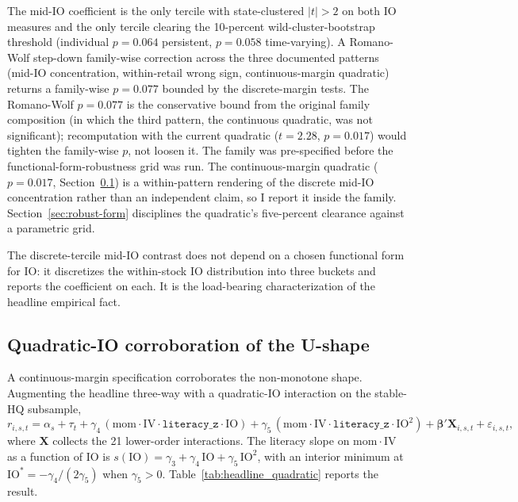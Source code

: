 The mid-IO coefficient is the only tercile with state-clustered $|t|>2$ on both IO measures and the only tercile clearing the 10-percent wild-cluster-bootstrap threshold (individual $p = 0.064$ persistent, $p = 0.058$ time-varying). A Romano-Wolf step-down family-wise correction across the three documented patterns (mid-IO concentration, within-retail wrong sign, continuous-margin quadratic) returns a family-wise $p = 0.077$ bounded by the discrete-margin tests. The Romano-Wolf $p = 0.077$ is the conservative bound from the original family composition (in which the third pattern, the continuous quadratic, was not significant); recomputation with the current quadratic ($t = 2.28$, $p = 0.017$) would tighten the family-wise $p$, not loosen it. The family was pre-specified before the functional-form-robustness grid was run. The continuous-margin quadratic ($p = 0.017$, Section~\ref{sec:quadratic}) is a within-pattern rendering of the discrete mid-IO concentration rather than an independent claim, so I report it inside the family. Section~\ref{sec:robust-form} disciplines the quadratic's five-percent clearance against a parametric grid.

The discrete-tercile mid-IO contrast does not depend on a chosen functional form for IO: it discretizes the within-stock IO distribution into three buckets and reports the coefficient on each. It is the load-bearing characterization of the headline empirical fact.

\subsection{Quadratic-IO corroboration of the U-shape}
\label{sec:quadratic}

A continuous-margin specification corroborates the non-monotone shape. Augmenting the headline three-way with a quadratic-IO interaction on the stable-HQ subsample,
\begin{equation}
\label{eq:quadIO}
r_{i,s,t} = \alpha_{s} + \tau_{t}
+ \gamma_{4}\,(\mathrm{mom}\cdot\mathrm{IV}\cdot\mathtt{literacy\_z}\cdot\mathrm{IO})
+ \gamma_{5}\,(\mathrm{mom}\cdot\mathrm{IV}\cdot\mathtt{literacy\_z}\cdot\mathrm{IO}^{2})
+ \boldsymbol{\beta}'\mathbf{X}_{i,s,t} + \varepsilon_{i,s,t},
\end{equation}
where $\mathbf{X}$ collects the 21 lower-order interactions. The literacy slope on $\mathrm{mom}\cdot\mathrm{IV}$ as a function of IO is $s(\mathrm{IO}) = \gamma_{3} + \gamma_{4}\,\mathrm{IO} + \gamma_{5}\,\mathrm{IO}^{2}$, with an interior minimum at $\mathrm{IO}^{\ast} = -\gamma_{4}/(2\gamma_{5})$ when $\gamma_{5} > 0$. Table~\ref{tab:headline_quadratic} reports the result.


